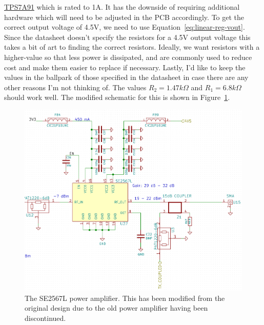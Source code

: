 \href{http://www.ti.com/lit/ds/symlink/tps7a91.pdf}{TPS7A91} which is rated to 1A. It has the
downside of requiring additional hardware which will need to be adjusted in the PCB accordingly. To
get the correct output voltage of 4.5V, we need to use Equation~\ref{eq:linear-reg-vout}. Since the
datasheet doesn't specify the resistors for a 4.5V output voltage this takes a bit of art to finding
the correct resistors. Ideally, we want resistors with a higher-value so that less power is
dissipated, and are commonly used to reduce cost and make them easier to replace if
necessary. Lastly, I'd like to keep the values in the ballpark of those specified in the datasheet
in case there are any other reasons I'm not thinking of. The values $R_2 = 1.47\si{k\Omega}$ and
$R_1 = 6.8\si{k\Omega}$ should work well. The modified schematic for this is shown in
Figure~\ref{fig:se2567l}.

\begin{figure}[h]
  \centering
  \includegraphics[width=\textwidth]{data/se2567l.png}
  \caption{The SE2567L power amplifier. This has been modified from the original design due to the
    old power amplifier having been discontinued.}
  \label{fig:se2567l}
\end{figure}